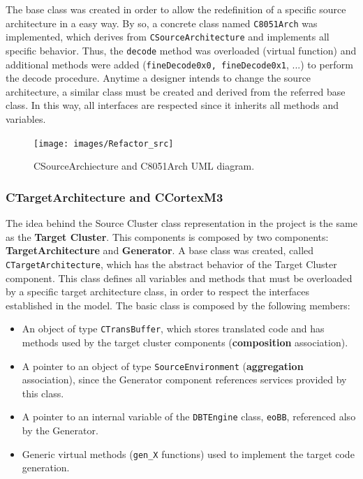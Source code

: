 The base class was created in order to allow the redefinition of a specific source architecture in a easy way. By so, a concrete class named \texttt{C8051Arch} was implemented, which derives from \texttt{CSourceArchitecture} and implements all specific behavior. Thus, the \texttt{decode} method was overloaded (virtual function) and additional methods were added (\texttt{fineDecode0x0, fineDecode0x1}, ...) to perform the decode procedure. Anytime a designer intends to change the source architecture, a similar class must be created and derived from the referred base class. In this way, all interfaces are respected since it inherits all methods and variables.

\begin{figure}[!htb]
\centerline{
\texttt{[image: images/Refactor\_src]}
}
\caption{CSourceArchiecture and C8051Arch UML diagram.}
\label{fig:sourcearchitectureUML} 
\end{figure}



\subsubsection*{CTargetArchitecture and CCortexM3}

The idea behind the Source Cluster class representation in the project is the same as the \textbf{Target Cluster}. This components is composed by two components: \textbf{TargetArchitecture} and \textbf{Generator}. A base class was created, called \texttt{CTargetArchitecture}, which has the abstract behavior of the Target Cluster component. This class defines all variables and methods that must be overloaded by a specific target architecture class, in order to respect the interfaces established in the model.  The basic class is composed by the following members:

\begin{itemize}
\item An object of type \texttt{CTransBuffer}, which stores translated code and has methods used by the target cluster components (\textbf{composition} association).
\item A pointer to an object of type \texttt{SourceEnvironment} (\textbf{aggregation} association), since the Generator component references services provided by this class.
\item A pointer to an internal variable of the \texttt{DBTEngine} class, \texttt{eoBB}, referenced also by the Generator.
\item Generic virtual methods (\texttt{gen\_X} functions) used to implement the target code generation. 
\end{itemize}

